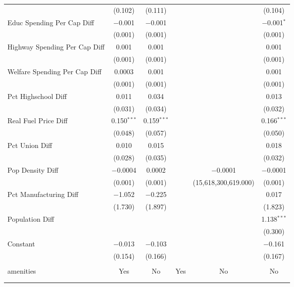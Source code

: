 \begin{table}[!htbp]
\begin{tabular}{@{\extracolsep{5pt}}lccccc}
  & (0.102) & (0.111) &  &  & (0.104) \\ 
  Educ Spending Per Cap Diff & $-$0.001 & $-$0.001 &  &  & $-$0.001$^{*}$ \\ 
  & (0.001) & (0.001) &  &  & (0.001) \\ 
  Highway Spending Per Cap Diff & 0.001 & 0.001 &  &  & 0.001 \\ 
  & (0.001) & (0.001) &  &  & (0.001) \\ 
  Welfare Spending Per Cap Diff & 0.0003 & 0.001 &  &  & 0.001 \\ 
  & (0.001) & (0.001) &  &  & (0.001) \\ 
  Pct Highschool Diff & 0.011 & 0.034 &  &  & 0.013 \\ 
  & (0.031) & (0.034) &  &  & (0.032) \\ 
  Real Fuel Price Diff & 0.150$^{***}$ & 0.159$^{***}$ &  &  & 0.166$^{***}$ \\ 
  & (0.048) & (0.057) &  &  & (0.050) \\ 
  Pct Union Diff & 0.010 & 0.015 &  &  & 0.018 \\ 
  & (0.028) & (0.035) &  &  & (0.032) \\ 
  Pop Density Diff & $-$0.0004 & 0.0002 &  & $-$0.0001 & $-$0.0001 \\ 
  & (0.001) & (0.001) &  & (15,618,300,619.000) & (0.001) \\ 
  Pct Manufacturing Diff & $-$1.052 & $-$0.225 &  &  & 0.017 \\ 
  & (1.730) & (1.897) &  &  & (1.823) \\ 
  Population Diff &  &  &  &  & 1.138$^{***}$ \\ 
  &  &  &  &  & (0.300) \\ 
  Constant & $-$0.013 & $-$0.103 &  &  & $-$0.161 \\ 
  & (0.154) & (0.166) &  &  & (0.167) \\ 
 \hline \\[-1.8ex] 
amenities & Yes & No & Yes & No & No \\ 
\hline \\[-1.8ex] 
\hline 
\hline \\[-1.8ex] 
\end{tabular} 
\end{table} 
